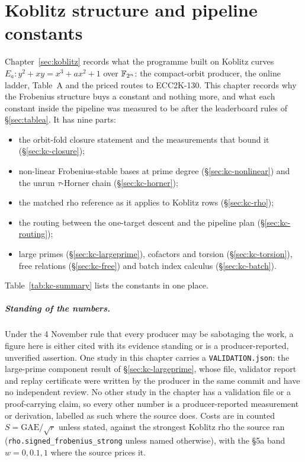 
\chapter{Koblitz structure and pipeline constants}\label{ch:koblitzconst}

Chapter~\ref{sec:koblitz} records what the programme built on Koblitz
curves $E_a: y^2+xy=x^3+ax^2+1$ over $\mathbb{F}_{2^n}$: the compact-orbit
producer, the online ladder, Table~A and the priced routes to ECC2K-130.
This chapter records why the Frobenius structure buys a constant and nothing
more, and what each constant inside the pipeline was measured to be after
the leaderboard rules of \S\ref{sec:tablea}. It has nine parts:
\begin{itemize}
\item the orbit-fold closure statement and the measurements that bound it
  (\S\ref{sec:kc-closure});
\item non-linear Frobenius-stable bases at prime degree
  (\S\ref{sec:kc-nonlinear}) and the unrun $\tau$-Horner chain
  (\S\ref{sec:kc-horner});
\item the matched rho reference as it applies to Koblitz rows
  (\S\ref{sec:kc-rho});
\item the routing between the one-target descent and the pipeline plan
  (\S\ref{sec:kc-routing});
\item large primes (\S\ref{sec:kc-largeprime}), cofactors and torsion
  (\S\ref{sec:kc-torsion}), free relations (\S\ref{sec:kc-free}) and batch
  index calculus (\S\ref{sec:kc-batch}).
\end{itemize}
Table~\ref{tab:kc-summary} lists the constants in one place.

\paragraph{Standing of the numbers.} Under the 4 November rule that every
producer may be sabotaging the work, a figure here is either cited with its
evidence standing or is a producer-reported, unverified assertion. One study
in this chapter carries a \texttt{VALIDATION.json}: the large-prime
component result of \S\ref{sec:kc-largeprime}, whose file, validator report
and replay certificate were written by the producer in the same commit and
have no independent review. No other study in the chapter has a validation
file or a proof-carrying claim, so every other number is a producer-reported
measurement or derivation, labelled as such where the source does. Costs
are in counted $S=\text{GAE}/\sqrt r$ unless stated, against the strongest
Koblitz rho the source ran (\texttt{rho.signed\_frobenius\_strong} unless
named otherwise), with the \S5a band $w=0,0.1,1$ where the source prices it.

